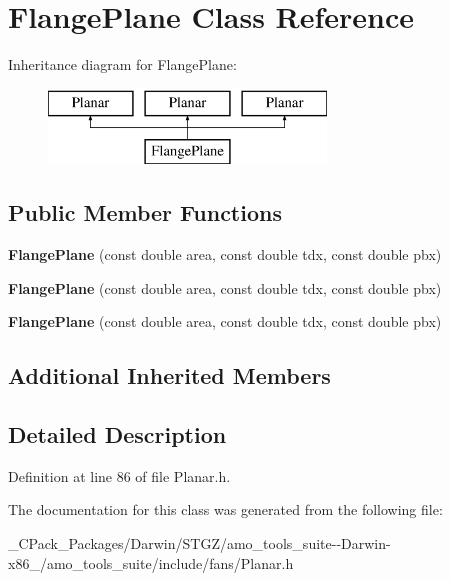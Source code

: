 \hypertarget{class_flange_plane}{}\section{Flange\+Plane Class Reference}
\label{class_flange_plane}
Inheritance diagram for Flange\+Plane\+:\begin{figure}[H]
\begin{center}
\leavevmode
\includegraphics[height=2.000000cm]{d0/de9/class_flange_plane}
\end{center}
\end{figure}
\subsection*{Public Member Functions}
\begin{DoxyCompactItemize}
\item 
\mbox{\label{class_flange_plane_a124814f4e579d4e0b415190e144147e6}} 
{\bfseries Flange\+Plane} (const double area, const double tdx, const double pbx)
\item 
\mbox{\label{class_flange_plane_a124814f4e579d4e0b415190e144147e6}} 
{\bfseries Flange\+Plane} (const double area, const double tdx, const double pbx)
\item 
\mbox{\label{class_flange_plane_a124814f4e579d4e0b415190e144147e6}} 
{\bfseries Flange\+Plane} (const double area, const double tdx, const double pbx)
\end{DoxyCompactItemize}
\subsection*{Additional Inherited Members}


\subsection{Detailed Description}


Definition at line 86 of file Planar.\+h.



The documentation for this class was generated from the following file\+:\begin{DoxyCompactItemize}
\item 
\+\_\+\+C\+Pack\+\_\+\+Packages/\+Darwin/\+S\+T\+G\+Z/amo\+\_\+tools\+\_\+suite-\/-\/\+Darwin-\/x86\+\_/amo\+\_\+tools\+\_\+suite/include/fans/Planar.\+h\end{DoxyCompactItemize}
